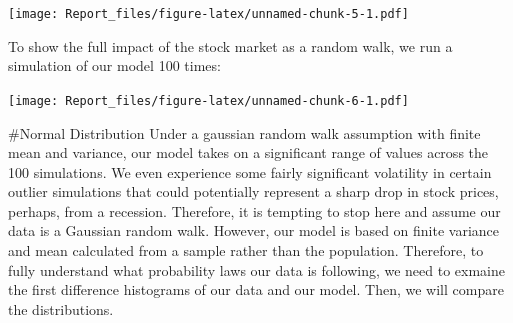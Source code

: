 \documentclass[]{article}
\newenvironment{Shaded}{\begin{snugshade}}{\end{snugshade}}
\newcommand{\CommentTok}[1]{\textcolor[rgb]{0.56,0.35,0.01}{\textit{#1}}}
\newcommand{\ControlFlowTok}[1]{\textcolor[rgb]{0.13,0.29,0.53}{\textbf{#1}}}
\newcommand{\DataTypeTok}[1]{\textcolor[rgb]{0.13,0.29,0.53}{#1}}
\newcommand{\DecValTok}[1]{\textcolor[rgb]{0.00,0.00,0.81}{#1}}
\newcommand{\KeywordTok}[1]{\textcolor[rgb]{0.13,0.29,0.53}{\textbf{#1}}}
\newcommand{\NormalTok}[1]{#1}
\newcommand{\OperatorTok}[1]{\textcolor[rgb]{0.81,0.36,0.00}{\textbf{#1}}}
\newcommand{\StringTok}[1]{\textcolor[rgb]{0.31,0.60,0.02}{#1}}
\begin{document}
\texttt{[image: Report\_files/figure-latex/unnamed-chunk-5-1.pdf]}

To show the full impact of the stock market as a random walk, we run a
simulation of our model 100 times:

\begin{Shaded}
\end{Shaded}

\texttt{[image: Report\_files/figure-latex/unnamed-chunk-6-1.pdf]}

\#Normal Distribution Under a gaussian random walk assumption with
finite mean and variance, our model takes on a significant range of
values across the 100 simulations. We even experience some fairly
significant volatility in certain outlier simulations that could
potentially represent a sharp drop in stock prices, perhaps, from a
recession. Therefore, it is tempting to stop here and assume our data is
a Gaussian random walk. However, our model is based on finite variance
and mean calculated from a sample rather than the population. Therefore,
to fully understand what probability laws our data is following, we need
to exmaine the first difference histograms of our data and our model.
Then, we will compare the distributions.
\end{document}
